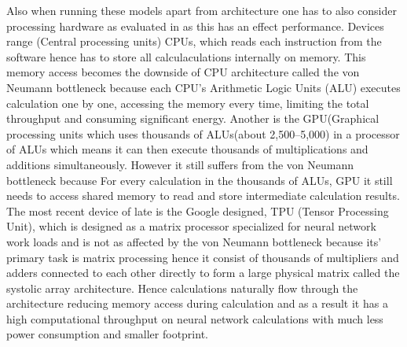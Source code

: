 Also when running these models apart from architecture one has to also consider processing hardware as evaluated in \citep{wang2019benchmarking} as this has an effect performance. Devices range (Central processing units) CPUs, which reads each instruction from the software hence has to store all calculaculations internally on memory. This memory access becomes the downside of CPU architecture called the von Neumann bottleneck because each CPU's Arithmetic Logic Units (ALU) executes calculation one by one, accessing the memory every time, limiting the total throughput and consuming significant energy. Another is the GPU(Graphical processing units which uses thousands of ALUs(about 2,500–5,000) in a processor of ALUs which means it can then execute thousands of multiplications and additions simultaneously. However it still suffers from the von Neumann bottleneck because For every  calculation in the thousands of ALUs, GPU it still needs to access shared memory to read and store intermediate calculation results. The most recent device of late is the Google designed, TPU (Tensor Processing Unit), which is designed as a matrix processor specialized for neural network work loads and is not as affected by the von Neumann bottleneck because its' primary task is matrix processing hence it consist of thousands of multipliers and adders connected to each other directly to form a large physical matrix called the systolic array architecture. Hence calculations naturally flow through the architecture reducing memory access during calculation and as a result it has a high computational throughput on neural network calculations with much less power consumption and smaller footprint.
  
  
    



